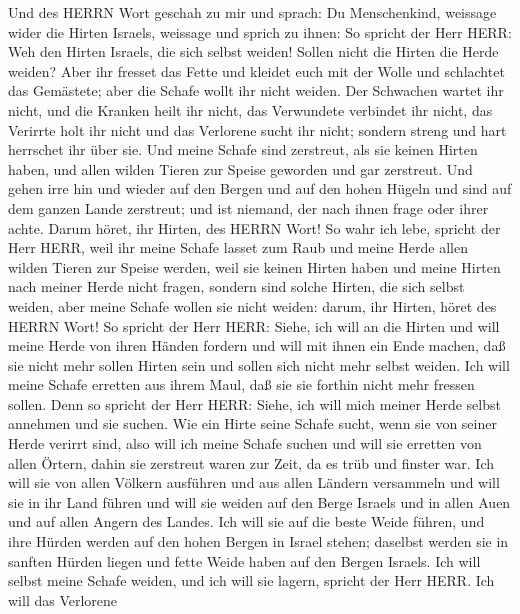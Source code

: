  Und des HERRN Wort geschah zu mir und sprach: 
Du Menschenkind, weissage wider die Hirten Israels, weissage und sprich
zu ihnen: So spricht der Herr HERR: Weh den Hirten Israels, die sich
selbst weiden! Sollen nicht die Hirten die Herde weiden? 
Aber ihr fresset das Fette und kleidet euch mit der Wolle und schlachtet
das Gemästete; aber die Schafe wollt ihr nicht weiden.  Der
Schwachen wartet ihr nicht, und die Kranken heilt ihr nicht, das
Verwundete verbindet ihr nicht, das Verirrte holt ihr nicht und das
Verlorene sucht ihr nicht; sondern streng und hart herrschet ihr über
sie.  Und meine Schafe sind zerstreut, als sie keinen Hirten
haben, und allen wilden Tieren zur Speise geworden und gar zerstreut.
 Und gehen irre hin und wieder auf den Bergen und auf den
hohen Hügeln und sind auf dem ganzen Lande zerstreut; und ist niemand,
der nach ihnen frage oder ihrer achte.  Darum höret, ihr
Hirten, des HERRN Wort!  So wahr ich lebe, spricht der Herr
HERR, weil ihr meine Schafe lasset zum Raub und meine Herde allen wilden
Tieren zur Speise werden, weil sie keinen Hirten haben und meine Hirten
nach meiner Herde nicht fragen, sondern sind solche Hirten, die sich
selbst weiden, aber meine Schafe wollen sie nicht weiden: 
darum, ihr Hirten, höret des HERRN Wort!  So spricht der
Herr HERR: Siehe, ich will an die Hirten und will meine Herde von ihren
Händen fordern und will mit ihnen ein Ende machen, daß sie nicht mehr
sollen Hirten sein und sollen sich nicht mehr selbst weiden. Ich will
meine Schafe erretten aus ihrem Maul, daß sie sie forthin nicht mehr
fressen sollen.  Denn so spricht der Herr HERR: Siehe, ich
will mich meiner Herde selbst annehmen und sie suchen.  Wie
ein Hirte seine Schafe sucht, wenn sie von seiner Herde verirrt sind,
also will ich meine Schafe suchen und will sie erretten von allen
Örtern, dahin sie zerstreut waren zur Zeit, da es trüb und finster war.
 Ich will sie von allen Völkern ausführen und aus allen
Ländern versammeln und will sie in ihr Land führen und will sie weiden
auf den Berge Israels und in allen Auen und auf allen Angern des Landes.
 Ich will sie auf die beste Weide führen, und ihre Hürden
werden auf den hohen Bergen in Israel stehen; daselbst werden sie in
sanften Hürden liegen und fette Weide haben auf den Bergen Israels.
 Ich will selbst meine Schafe weiden, und ich will sie
lagern, spricht der Herr HERR.  Ich will das Verlorene
